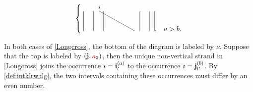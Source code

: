 \begin{align}
\begin{cases}
\begin{tikzpicture}
        \draw[-] (1.4,0) -- (1.4,1)  \toplabel{}
                 (1.9,0) -- (1.9,1)
                 (2.4,0) -- (2.4,1);
        \draw[-] (4.75,0) -- (4.75,1)  \toplabel{}
                 (4.25,0) -- (4.25,1)
                 (5,0) -- (5,1);
        \draw[-] (4,0) -- (2.2,1)\toplabel{i};
    \end{tikzpicture}, & a>b.
    \end{cases}
\end{align}

In both cases of \cref{Longcross}, the bottom of the diagram is labeled by $\nu$.  
Suppose that the top is labeled by $(\mathbf{j},{\color{red}\kappa}_2)$, then the unique non-vertical strand in \cref{Longcross} joins the occurrence \(i=\mathbf{i}^{(a)}_l\) to the occurrence \(i=\mathbf{j}^{(b)}_{l'}\). By \cref{def:intklrwalg}, the two intervals containing these occurrences must differ by an even number. 


